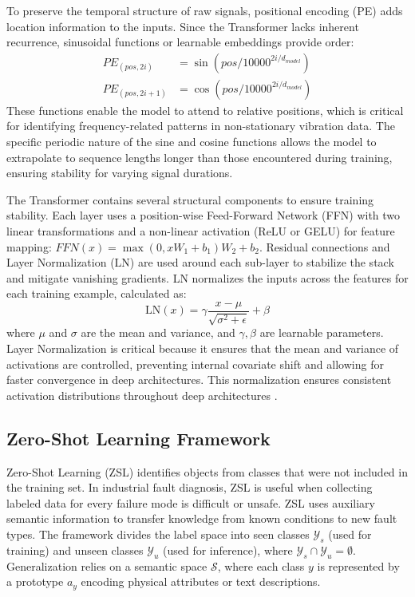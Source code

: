 To preserve the temporal structure of raw signals, positional encoding (PE) adds location information to the inputs. Since the Transformer lacks inherent recurrence, sinusoidal functions or learnable embeddings provide order:
\begin{equation}
\begin{aligned}
PE_{(pos, 2i)} &= \sin(pos / 10000^{2i/d_{model}}) \\
PE_{(pos, 2i+1)} &= \cos(pos / 10000^{2i/d_{model}})
\end{aligned}
\end{equation}
These functions enable the model to attend to relative positions, which is critical for identifying frequency-related patterns in non-stationary vibration data. The specific periodic nature of the sine and cosine functions allows the model to extrapolate to sequence lengths longer than those encountered during training, ensuring stability for varying signal durations.

The Transformer contains several structural components to ensure training stability. Each layer uses a position-wise Feed-Forward Network (FFN) with two linear transformations and a non-linear activation (ReLU or GELU) for feature mapping: $FFN(x) = \max(0, xW_1 + b_1)W_2 + b_2$. Residual connections and Layer Normalization (LN) are used around each sub-layer to stabilize the stack and mitigate vanishing gradients. LN normalizes the inputs across the features for each training example, calculated as:
\begin{equation}
\text{LN}(x) = \gamma \frac{x - \mu}{\sqrt{\sigma^2 + \epsilon}} + \beta
\end{equation}
where $\mu$ and $\sigma$ are the mean and variance, and $\gamma, \beta$ are learnable parameters. Layer Normalization is critical because it ensures that the mean and variance of activations are controlled, preventing internal covariate shift and allowing for faster convergence in deep architectures. This normalization ensures consistent activation distributions throughout deep architectures \cite{vaswani2017attention}.

\subsection{Zero-Shot Learning Framework}
Zero-Shot Learning (ZSL) identifies objects from classes that were not included in the training set. In industrial fault diagnosis, ZSL is useful when collecting labeled data for every failure mode is difficult or unsafe. ZSL uses auxiliary semantic information to transfer knowledge from known conditions to new fault types. The framework divides the label space into seen classes $\mathcal{Y}_s$ (used for training) and unseen classes $\mathcal{Y}_u$ (used for inference), where $\mathcal{Y}_s \cap \mathcal{Y}_u = \emptyset$. Generalization relies on a semantic space $\mathcal{S}$, where each class $y$ is represented by a prototype $a_y$ encoding physical attributes or text descriptions.

